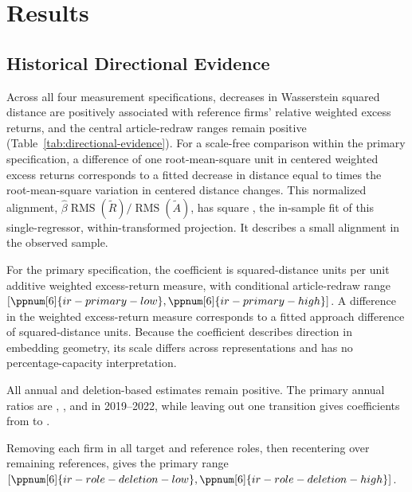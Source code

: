 \section{Results}\label{sec:results}

\subsection{Historical Directional Evidence}\label{sec:historical-evidence}

Across all four measurement specifications, decreases in Wasserstein squared
distance are positively
associated with reference firms' relative weighted excess returns, and the central
article-redraw ranges remain positive
(Table~\ref{tab:directional-evidence}).
For a scale-free comparison within the primary specification, a difference of
one root-mean-square unit in centered weighted excess returns corresponds to
a fitted decrease in distance equal to 
times the root-mean-square variation in centered distance changes.
This normalized alignment,
$\widehat\beta\operatorname{RMS}(\widetilde R)/\operatorname{RMS}(\widetilde A)$,
has square , the in-sample fit of this
single-regressor, within-transformed projection.
It describes a small alignment in the observed sample.

For the primary specification, the coefficient is
 squared-distance units per unit additive
weighted excess-return measure, with conditional article-redraw range
$[\ppnum[6]{ir-primary-low},\ppnum[6]{ir-primary-high}]$.
A  difference in the weighted excess-return measure
corresponds to a fitted approach
difference of  squared-distance units.
Because the coefficient describes direction in embedding geometry, its scale
differs across representations and has no percentage-capacity interpretation.



All annual and deletion-based estimates remain positive.
The primary annual ratios are ,
,  and
 in 2019--2022, while leaving out one
transition gives coefficients from
 to .

Removing each firm in all target and reference roles, then recentering over
remaining references, gives the primary range
$[\ppnum[6]{ir-role-deletion-low},\ppnum[6]{ir-role-deletion-high}]$.

